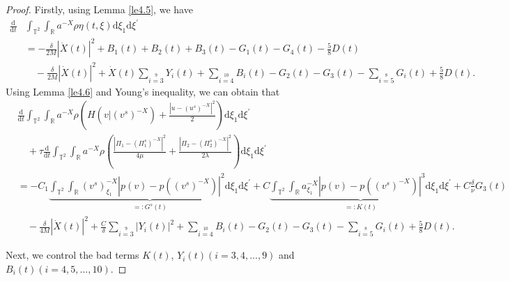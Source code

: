 \documentclass[10pt,reqno]{amsart}
\numberwithin{equation}{section}
\newcommand{\dif}{\mathrm{d}}
\begin{document}
\begin{proof}
Firstly, using Lemma \ref{le4.5}, we have
\begin{align*}
\frac{\dif}{\dif t}&\int_{\mathbb{T}^2}\int_{\mathbb{R}}a^{-X}\rho\eta(t, \xi)\dif \xi_1\dif \xi^{\prime}\\
&=-\frac{\delta}{2M}|\dot{X}(t)|^2+B_1(t)+B_2(t)+B_{3}(t)-G_1(t)-G_4(t)-\frac{5}{8}D(t)\\
&\quad -\frac{\delta}{2M}|\dot{X}(t)|^2+\dot{X}(t)\sum\limits_{i=3}\limits^9Y_i(t)
+\sum\limits_{i=4}\limits^{10}B_i(t)-G_2(t)-G_3(t)-\sum\limits_{i=5}\limits^8G_i(t)+\frac{5}{8}D(t).
\end{align*}
Using Lemma \ref{le4.6} and Young's inequality, we can obtain that
\begin{align*}
&\frac{\dif}{\dif t}\int_{\mathbb{T}^2}\int_{\mathbb{R}}a^{-X}\rho\left(H(v|(v^s)^{-X})+\frac{|u-(u^s)^{-X}|^2}{2}
\right)\dif \xi_1\dif \xi^{\prime}\\
&\quad+\tau\frac{\dif}{\dif t}\int_{\mathbb{T}^2}\int_{\mathbb{R}}a^{-X}\rho\left(
\frac{|\Pi_1-(\Pi_1^s)^{-X}|^2}{4\mu}+\frac{|\Pi_2-(\Pi_2^s)^{-X}|^2}{2\lambda}\right)\dif \xi_1\dif \xi^{\prime}\\
&=-C_1\underbrace{\int_{\mathbb{T}^2}\int_{\mathbb{R}}(v^s)^{-X}_{\xi_1}|p(v)-p((v^s)^{-X})|^2\dif \xi_1\dif \xi^{\prime}}\limits_{=:G^s(t)}
+C\underbrace{\int_{\mathbb{T}^2}\int_{\mathbb{R}}a^{-X}_{\xi_1}|p(v)-p((v^s)^{-X})|^3\dif \xi_1\dif \xi^{\prime}}\limits_{=:K(t)}
+C\frac{\delta}{\nu}G_3(t)\\
&\quad -\frac{\delta}{4M}|\dot{X}(t)|^2+\frac{C}{\delta}\sum\limits_{i=3}\limits^9|Y_i(t)|^2
+\sum\limits_{i=4}\limits^{10}B_i(t)-G_2(t)-G_3(t)-\sum\limits_{i=5}\limits^8G_i(t)+\frac{5}{8}D(t).
\end{align*}

Next, we control the bad terms $K(t)$, $Y_i(t)(i=3, 4, ..., 9)$ and $B_i(t)(i=4, 5, ..., 10)$.


\end{proof}
\end{document}
